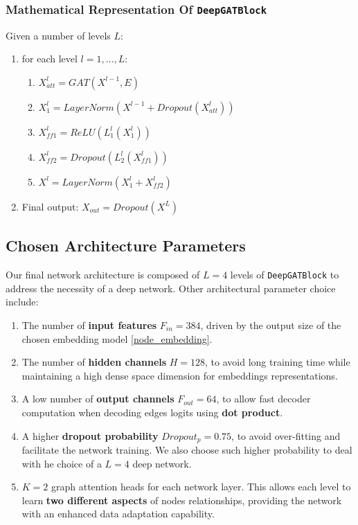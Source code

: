 \documentclass[11pt]{article}
\begin{document}
	\subsubsection{Mathematical Representation Of \texttt{DeepGATBlock}}
	Given a number of levels $L$:
	\begin{enumerate}
		\item for each level $l=1, \dots, L$:
		\begin{enumerate}
			\item $X_{att}^l = GAT(X^{l-1}, E)$
			\item $X_1^l = LayerNorm(X^{l-1} + Dropout(X_{att}^l))$
			\item $X_{ff1}^l = ReLU(L_1^l(X_1^l))$
			\item $X_{ff2}^l = Dropout(L_2^l(X_{ff1}^l))$
			\item $X^l = LayerNorm(X_1^l + X_{ff2}^l)$
		\end{enumerate}
		\item Final output: $X_{out} = Dropout(X^L)$
	\end{enumerate}
	
	\subsection{Chosen Architecture Parameters}
	Our final network architecture is composed of $L=4$ levels of \texttt{DeepGATBlock} to address the necessity of a deep network. Other architectural parameter choice include:
	\begin{enumerate}
		\item The number of \textbf{input features} $F_{in}=384$, driven by the output size of the chosen embedding model \ref{node_embedding}.
		
		\item The number of \textbf{hidden channels} $H=128$, to avoid long training time while maintaining a high dense space dimension for embeddings representations. 
		
		\item A low number of \textbf{output channels} $F_{out}=64$, to allow fast decoder computation when decoding edges logits using \textbf{dot product}.
		
		\item A higher \textbf{dropout probability} $Dropout_p=0.75$, to avoid over-fitting and facilitate the network training. We also choose such higher probability to deal with he choice of a $L=4$ deep network.  
		
		\item $K=2$ graph attention heads for each network layer. This allows each level to learn \textbf{two different aspects} of nodes relationships, providing the network with an enhanced data adaptation capability. 
	\end{enumerate}
	
\end{document}

